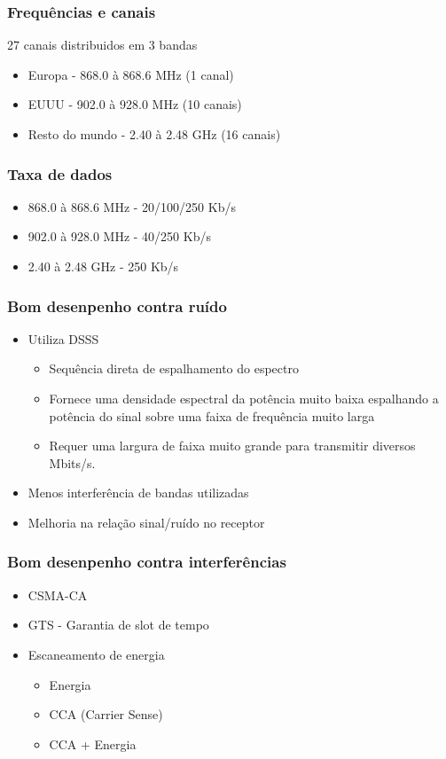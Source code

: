 \documentclass{beamer}
\begin{document}
  \frame
  {
    \frametitle{Frequências e canais}
    27 canais distribuidos em 3 bandas
    \begin{itemize}
      \item Europa - 868.0 à 868.6 MHz (1 canal)
      \item EUUU - 902.0 à 928.0 MHz (10 canais)
      \item Resto do mundo - 2.40 à 2.48 GHz (16 canais)
    \end{itemize}
  }

  \frame
  {
    \frametitle{Taxa de dados}
    \begin{itemize}
      \item 868.0 à 868.6 MHz - 20/100/250 Kb/s
      \item 902.0 à 928.0 MHz - 40/250 Kb/s
      \item 2.40 à 2.48 GHz - 250 Kb/s
    \end{itemize}
  }

    \frame
  {
    \frametitle{Bom desenpenho contra ruído}
    \begin{itemize}
	\item Utiliza DSSS
	  \begin{itemize}
	    \item Sequência direta de espalhamento do espectro
	    \item Fornece uma densidade espectral da potência muito baixa espalhando a potência do sinal sobre uma faixa de frequência muito larga
	    \item Requer uma largura de faixa muito grande para transmitir diversos Mbits/s.
	  \end{itemize}
	\item Menos interferência de bandas utilizadas
	\item Melhoria na relação sinal/ruído no receptor
    \end{itemize}
  }

  \frame
  {
    \frametitle{Bom desenpenho contra interferências}
    \begin{itemize}
	\item CSMA-CA
	\item GTS - Garantia de slot de tempo
	\item Escaneamento de energia
	  \begin{itemize}
	    \item Energia
	    \item CCA (Carrier Sense)
	    \item CCA + Energia
	  \end{itemize}
    \end{itemize}
  }
\end{document}
